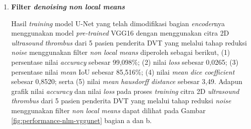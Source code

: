 \begin{enumerate}
	\item \textbf{Filter \textit{denoising} \textit{non local means}}
	
	
	Hasil \textit{training} model U-Net yang telah dimodifikasi bagian \textit{encoder}nya menggunakan model \textit{pre-trained} VGG16 dengan menggunakan citra 2D \textit{ultrasound} \textit{thrombus} dari 5 pasien penderita DVT yang melalui tahap reduksi \textit{noise} menggunakan filter \textit{non local means} diperoleh sebagai berikut, (1) persentase nilai \textit{accuracy} sebesar 99,098\%; (2) nilai \textit{loss} sebesar 0,0265; (3) persentase nilai \textit{mean} IoU sebesar 85,516\%; (4) nilai \textit{mean} \textit{dice coefficient} sebesar 0,8520; serta (5) nilai \textit{mean} \textit{hausdorff distance} sebesar 3,49. Adapun grafik nilai \textit{accuracy} dan nilai \textit{loss} pada proses \textit{training} citra 2D \textit{ultrasound} \textit{thrombus} dari 5 pasien penderita DVT yang melalui tahap reduksi \textit{noise} menggunakan filter \textit{non local means} dapat dilihat pada Gambar \ref{fig:performance-nlm-vggunet} bagian a dan b.
	

\end{enumerate}
